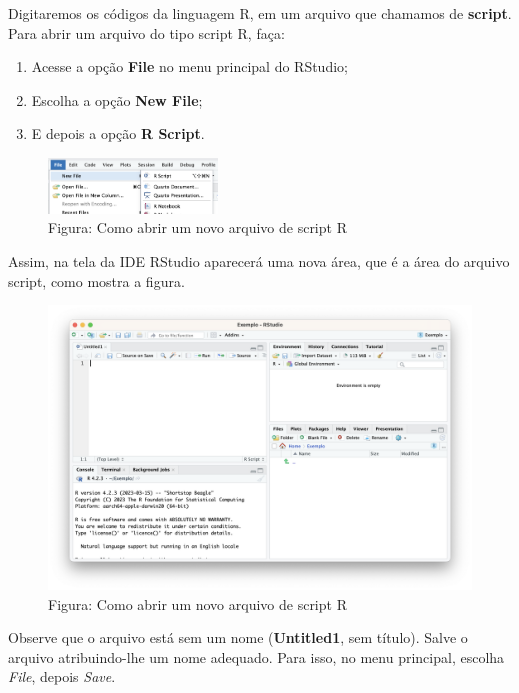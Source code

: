 \documentclass[
]{book}
\providecommand{\tightlist}{%
  \setlength{\itemsep}{0pt}\setlength{\parskip}{0pt}}
\begin{document}
Digitaremos os códigos da linguagem R, em um arquivo que chamamos de \textbf{script}. Para abrir um arquivo do tipo script R, faça:

\begin{enumerate}
\def\labelenumi{\arabic{enumi}.}
\tightlist
\item
  Acesse a opção \textbf{File} no menu principal do RStudio;
\item
  Escolha a opção \textbf{New File};
\item
  E depois a opção \textbf{R Script}.
\end{enumerate}

\begin{figure}
\centering
\includegraphics[width=0.4\textwidth,height=\textheight]{arquivoScript.png}
\caption{Figura: Como abrir um novo arquivo de script R}
\end{figure}

Assim, na tela da IDE RStudio aparecerá uma nova área, que é a área do arquivo script, como mostra a figura.

\begin{figure}
\centering
\includegraphics{telaScript.png}
\caption{Figura: Como abrir um novo arquivo de script R}
\end{figure}

Observe que o arquivo está sem um nome (\textbf{Untitled1}, sem título). Salve o arquivo atribuindo-lhe um nome adequado. Para isso, no menu principal, escolha \emph{File}, depois \emph{Save}.
\end{document}
